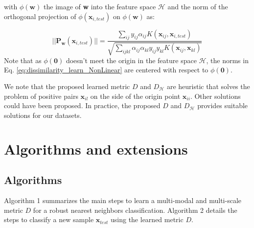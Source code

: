 \noindent with $\phi(\textbf{w})$ the image of \textbf{w} into the feature space $\mathcal{H}$ and the norm of the orthogonal projection of $\phi(\textbf{x}_{i,test})$ on $\phi(\textbf{w})$ as:

\begin{equation}
||\textbf{P}_\textbf{w}(\textbf{x}_{i,test})|| = \frac
	{\sum_{ij} y_{ij} \alpha_{ij} K(\textbf{x}_{ij},\textbf{x}_{i,test})}
	{\sqrt{\sum_{ijkl} \alpha_{ij} \alpha_{kl} y_{ij} y_{kl}
		K(\textbf{x}_{ij},\textbf{x}_{kl})
	}}
\end{equation}
Note that as $\phi(\textbf{0})$ doesn’t meet the origin in the feature space $\mathcal{H}$, the norms in Eq. \ref{eq:dissimilarity_learn_NonLinear} are centered with respect to $\phi(\textbf{0})$. 

We note that the proposed learned metric $D$ and $D_\mathcal{H}$ are heuristic that solves the problem of positive pairs $\textbf{x}_{il}$ on the side of the origin point $\textbf{x}_{ii}$. Other solutions could have been proposed. In practice, the proposed $D$ and $D_\mathcal{H}$ provides suitable solutions for our datasets.



\section{Algorithms and extensions}
\subsection{Algorithms}
\noindent Algorithm 1 summarizes the main steps to learn a multi-modal and multi-scale metric $D$ for a robust nearest neighbors classification. Algorithm 2 details the steps to classify a new sample $\textbf{x}_{test}$ using the learned metric $D$. 

